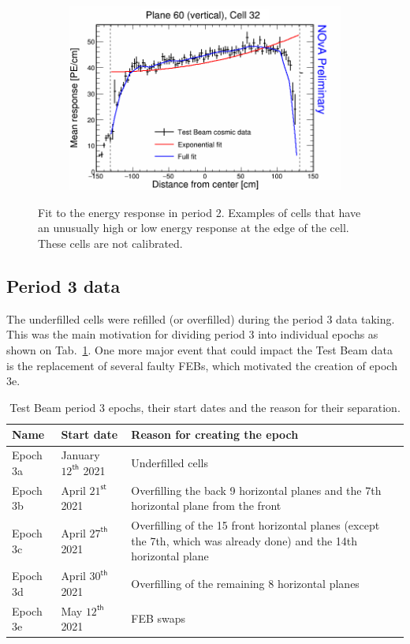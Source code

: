 \begin{figure}[h]
\begin{subfigure}{0.5\textwidth}
  \end{subfigure}
  \begin{subfigure}{0.5\textwidth}
    \includegraphics[width=\linewidth]{RelativeCalibrationResults/p2_060_032.png}
  \end{subfigure}
  \caption{Fit to the energy response in period 2. Examples of cells that have an unusually high or low energy response at the edge of the cell. These cells are not calibrated.}
  \label{fig:AttenfitResultsPerio2_CellEdge}
\end{figure}

\FloatBarrier
\subsection{Period 3 data}\label{sec:TBCalibration_period3}
The underfilled cells were refilled (or overfilled) during the period 3 data taking. This was the main motivation for dividing period 3 into individual epochs as shown on Tab.~\ref{tab:TestBeamPeriod3Epochs}. One more major event that could impact the Test Beam data is the replacement of several faulty FEBs, which motivated the creation of epoch 3e.

\begin{table}[!ht]
\centering
\def\arraystretch{1.4}
\begin{tabular}{m{} m{} m{}}
Name & Start date & Reason for creating the epoch\\\hline
Epoch 3a & January $12^{\textsf{th}}$ 2021 & Underfilled cells\\
Epoch 3b & April $21^{\textsf{st}}$ 2021 & Overfilling the back 9 horizontal planes and the 7th horizontal plane from the front\\
Epoch 3c & April $27^{\textsf{th}}$ 2021 & Overfilling of the 15 front horizontal planes (except the 7th, which was already done) and the 14th horizontal plane\\
Epoch 3d & April $30^{\textsf{th}}$ 2021 & Overfilling of the remaining 8 horizontal planes\\
Epoch 3e & May $12^{\textsf{th}}$ 2021 & FEB swaps
\end{tabular}
\caption{Test Beam period 3 epochs, their start dates and the reason for their separation.}
\label{tab:TestBeamPeriod3Epochs}
\end{table}

